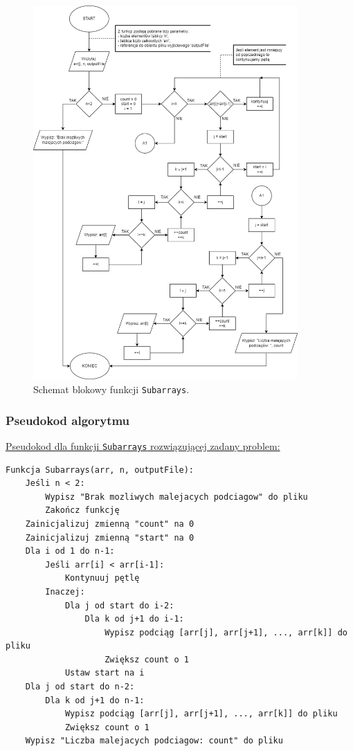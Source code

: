 \documentclass[a4paper,12pt]{article}
\begin{document}
\begin{figure}[H]
    \centering
    \includegraphics[width=0.9\textwidth]{Schemat1r.png}
    \caption{Schemat blokowy funkcji \texttt{Subarrays}.}
    \label{fig:schemat_Subarrays1}
\end{figure}

\newpage

\subsubsection{Pseudokod algorytmu}

\underline{Pseudokod dla funkcji \texttt{Subarrays} rozwiązującej zadany problem: } 
\begin{verbatim}
Funkcja Subarrays(arr, n, outputFile):
    Jeśli n < 2:
        Wypisz "Brak mozliwych malejacych podciagow" do pliku
        Zakończ funkcję
    Zainicjalizuj zmienną "count" na 0
    Zainicjalizuj zmienną "start" na 0
    Dla i od 1 do n-1:
        Jeśli arr[i] < arr[i-1]:
            Kontynuuj pętlę
        Inaczej:
            Dla j od start do i-2:
                Dla k od j+1 do i-1:
                    Wypisz podciąg [arr[j], arr[j+1], ..., arr[k]] do pliku
                    Zwiększ count o 1
            Ustaw start na i
    Dla j od start do n-2:
        Dla k od j+1 do n-1:
            Wypisz podciąg [arr[j], arr[j+1], ..., arr[k]] do pliku
            Zwiększ count o 1
    Wypisz "Liczba malejacych podciagow: count" do pliku
\end{verbatim}
\end{document}
